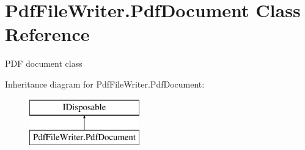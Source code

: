 \hypertarget{class_pdf_file_writer_1_1_pdf_document}{}\section{Pdf\+File\+Writer.\+Pdf\+Document Class Reference}
\label{class_pdf_file_writer_1_1_pdf_document}


P\+DF document class  


Inheritance diagram for Pdf\+File\+Writer.\+Pdf\+Document\+:\begin{figure}[H]
\begin{center}
\leavevmode
\includegraphics[height=2.000000cm]{class_pdf_file_writer_1_1_pdf_document}
\end{center}
\end{figure}
